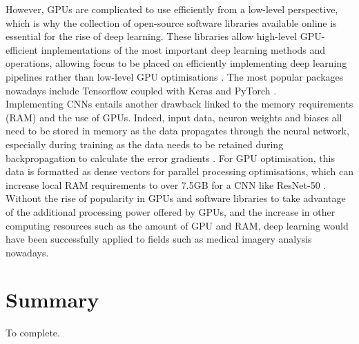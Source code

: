 However, GPUs are complicated to use efficiently from a low-level perspective, which is why the collection of open-source software libraries available online is essential for the rise of deep learning. These libraries allow high-level GPU-efficient implementations of the most important deep learning methods and operations, allowing focus to be placed on efficiently implementing deep learning pipelines rather than low-level GPU optimisations \citep{Litjens2017}. The most popular packages nowadays include Tensorflow \citep{tensorflow2015-whitepaper} coupled with Keras \citep{chollet2015keras} and PyTorch \citep{pytorch}.\\

Implementing CNNs entails another drawback linked to the memory requirements (RAM) and the use of GPUs. Indeed, input data, neuron weights and biases all need to be stored in memory as the data propagates through the neural network, especially during training as the data needs to be retained during backpropagation to calculate the error gradients \citep{Geron2019}. For GPU optimisation, this data is formatted as dense vectors for parallel processing optimisations, which can increase local RAM requirements to over 7.5GB for a CNN like ResNet-50 \citep{Hanlon2016}.\\

Without the rise of popularity in GPUs and software libraries to take advantage of the additional processing power offered by GPUs, and the increase in other computing resources such as the amount of GPU and RAM, deep learning would have been successfully applied to fields such as medical imagery analysis nowadays.


\section{Summary}

To complete.